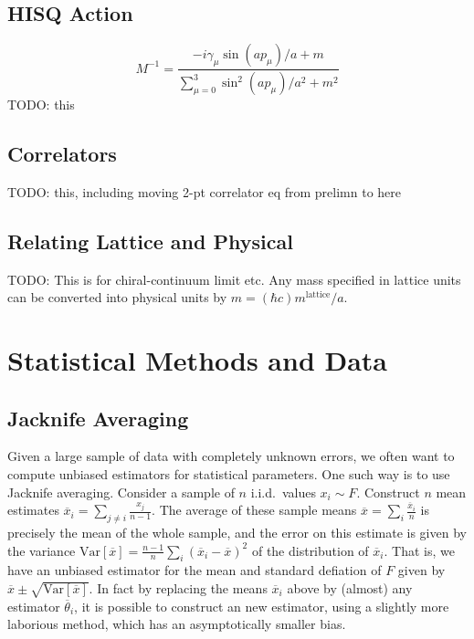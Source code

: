 \documentclass[a4paper,12pt]{article}
\begin{document}
\subsection{HISQ Action}

\begin{equation}
    M^{-1} = \frac{-i\gamma_\mu \sin(ap_\mu)/a+m}{\sum_{\mu=0}^3 \sin^2(ap_\mu)/a^2 + m^2}
\end{equation}
TODO: this

\subsection{Correlators}
TODO: this, including moving 2-pt correlator eq from prelimn to here

\subsection{Relating Lattice and Physical}
TODO: This is for chiral-continuum limit etc.
Any mass specified in lattice units can be converted into physical units by $m = (\hbar c) m^\mathrm{lattice} / a$.

\section{Statistical Methods and Data}
\subsection{Jacknife Averaging}
Given a large sample of data with completely unknown errors, we often want to compute unbiased estimators for statistical parameters. One such way is to use Jacknife averaging\cite{efron1982jackknife}. Consider a sample of $n$ i.i.d.\ values $x_i \sim F$. Construct $n$ mean estimates $\overline{x}_i = \sum_{j\neq i} \frac{x_j}{n-1}$. The average of these sample means $\overline{x} = \sum_i\frac{\overline{x}_i}{n}$ is precisely the mean of the whole sample, and the error on this estimate is given by the variance $\text{Var}[\overline{x}] = \frac{n-1}{n}\sum_i{(\overline{x}_i - \overline{x})}^2$ of the distribution of $\overline{x}_i$. That is, we have an unbiased estimator for the mean and standard defiation of $F$ given by $\overline{x} \pm \sqrt{\text{Var}[\overline{x}]}$. In fact by replacing the means $\overline{x}_i$ above by (almost) any estimator $\overline{\theta}_i$, it is possible to construct an new estimator, using a slightly more laborious method, which has an asymptotically smaller bias\cite{mcintosh2016jackknife}.
\end{document}
